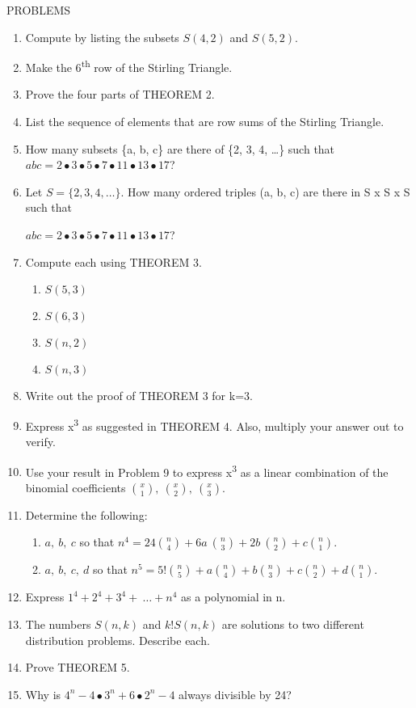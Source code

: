 \documentclass[10pt,letter]{article}
\begin{document}
PROBLEMS
\begin{enumerate}
\def\labelenumi{\arabic{enumi}.}

\item
  Compute by listing the subsets \(S(4,2)\) and \(S(5,2)\).
\item
  Make the 6\textsuperscript{th} row of the Stirling Triangle.
\item
  Prove the four parts of THEOREM 2.
\item
  List the sequence of elements that are row sums of the Stirling
  Triangle.
\item
  How many subsets \{a, b, c\} are there of \{2, 3, 4, \ldots{}\} such
  that
  \(abc = 2 \bullet 3 \bullet 5 \bullet 7 \bullet 11 \bullet 13 \bullet 17\)?
\item
  Let \(S = \{ 2,3,4,\ldots\}\). How many ordered triples (a, b, c) are
  there in S x S x S such that

\(abc = 2 \bullet 3 \bullet 5 \bullet 7 \bullet 11 \bullet 13 \bullet 17\)?
\item
  Compute each using THEOREM 3.
\begin{enumerate}
  \def\labelenumii{\alph{enumii}.}

  \item
    \(S\left( 5,3 \right)\)
  \item
    \(S(6,3)\)
  \item
    \(S(n,2)\)
  \item
    \(S(n,3)\)

\end{enumerate}
\item
  Write out the proof of THEOREM 3 for k=3.
\item
  Express x\textsuperscript{3} as suggested in THEOREM 4. Also, multiply
  your answer out to verify.
\item
  Use your result in Problem 9 to express x\textsuperscript{3} as a
  linear combination of the binomial coefficients \(\binom{x}{1}
,\
\binom{x}{2}
,\
\binom{x}{3}
\).
\item
  Determine the following:
\begin{enumerate}
  \def\labelenumii{\alph{enumii}.}

  \item
    \(a,\ b,\ c\) so that \(n^{4} = 24
\binom{n}{4}
 + 6a\
\binom{n}{3}
 + 2b\
\binom{n}{2}
 + c
\binom{n}{1}
\).
  \item
    \(a,\ b,\ c,\ d\) so that \(n^{5} = 5!
\binom{n}{5}
 + a
\binom{n}{4}
 + b
\binom{n}{3}
 + c
\binom{n}{2}
 + d
\binom{n}{1}
\).

\end{enumerate}
\item
  Express \(1^{4} + 2^{4} + 3^{4} + \ \ldots + n^{4}\) as a polynomial
  in n.
\item
  The numbers \(S(n,k)\) and \(k!S(n,k)\) are solutions to two different
  distribution problems. Describe each.
\item
  Prove THEOREM 5.
\item
  Why is \(4^{n} - 4 \bullet 3^{n} + 6 \bullet 2^{n} - 4\) always
  divisible by 24?

\end{enumerate}
\end{document}
